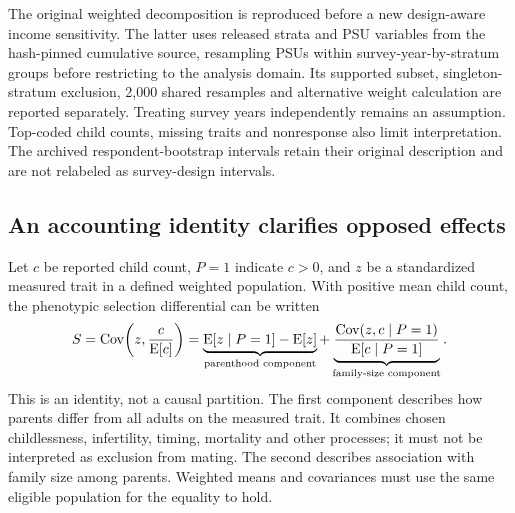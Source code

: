 

The original weighted decomposition is reproduced before a new design-aware income sensitivity. The latter uses released strata and PSU variables from the hash-pinned cumulative source, resampling PSUs within survey-year-by-stratum groups before restricting to the analysis domain. Its supported subset, singleton-stratum exclusion, 2,000 shared resamples and alternative weight calculation are reported separately. Treating survey years independently remains an assumption. Top-coded child counts, missing traits and nonresponse also limit interpretation. The archived respondent-bootstrap intervals retain their original description and are not relabeled as survey-design intervals.

\subsection{An accounting identity clarifies opposed effects}

Let $c$ be reported child count, $P=1$ indicate $c>0$, and $z$ be a standardized measured trait in a defined weighted population. With positive mean child count, the phenotypic selection differential can be written
\begin{equation}
S=\operatorname{Cov}\!\left(z,\frac{c}{\operatorname{E}[c]}\right)
=\underbrace{\operatorname{E}[z\mid P=1]-\operatorname{E}[z]}_{\text{parenthood component}}
+\underbrace{\frac{\operatorname{Cov}(z,c\mid P=1)}{\operatorname{E}[c\mid P=1]}}_{\text{family-size component}}.
\label{eq:minds-decomposition}
\end{equation}
This is an identity, not a causal partition. The first component describes how parents differ from all adults on the measured trait. It combines chosen childlessness, infertility, timing, mortality and other processes; it must not be interpreted as exclusion from mating. The second describes association with family size among parents. Weighted means and covariances must use the same eligible population for the equality to hold.


